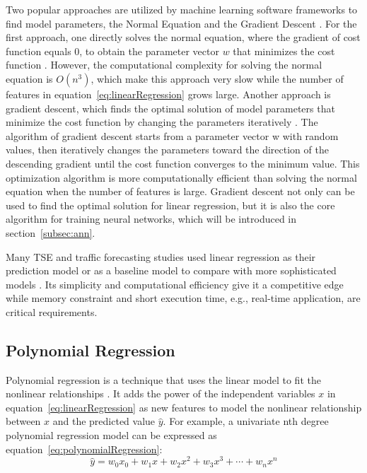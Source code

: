 \documentclass[english]{kththesis}
\begin{document}
Two popular approaches are utilized by machine learning software frameworks to find model parameters, the Normal Equation and the Gradient Descent \cite{geron_handson_ml}. For the first approach, one directly solves the normal equation, where the gradient of cost function equals 0, to obtain the parameter vector $w$ that minimizes the cost function \cite{geron_handson_ml}. However, the computational complexity for solving the normal equation is $O(n^3)$, which make this approach very slow while the number of features in equation~\ref{eq:linearRegression} grows large. Another approach is gradient descent, which finds the optimal solution of model parameters that minimize the cost function by changing the parameters iteratively \cite{geron_handson_ml}. The algorithm of gradient descent starts from a parameter vector w with random values, then iteratively changes the parameters toward the direction of the descending gradient until the cost function converges to the minimum value. This optimization algorithm is more computationally efficient than solving the normal equation when the number of features is large. Gradient descent not only can be used to find the optimal solution for linear regression, but it is also the core algorithm for training neural networks, which will be introduced in section~\ref{subsec:ann}.

Many TSE and traffic forecasting studies used linear regression as their prediction model or as a baseline model to compare with more sophisticated models \cite{blandin_individual_speed, chen_imputation_regression, nikovski_univariate_prediction}. Its simplicity and computational efficiency give it a competitive edge while memory constraint and short execution time, e.g., real-time application, are critical requirements.

\subsection{Polynomial Regression}
\label{subsec:polyRegression}
Polynomial regression is a technique that uses the linear model to fit the nonlinear relationships \cite{geron_handson_ml}. It adds the power of the independent variables $x$ in equation~\ref{eq:linearRegression} as new features to model the nonlinear relationship between $x$ and the predicted value $\hat{y}$. For example, a univariate nth degree polynomial regression model can be expressed as equation~\ref{eq:polynomialRegression}:
\begin{equation}
    \hat{y} = w_0 x_0 + w_1 x + w_2 x^2 + w_3 x^3 + \cdots + w_n x^n
    \label{eq:polynomialRegression}
\end{equation}
\end{document}

